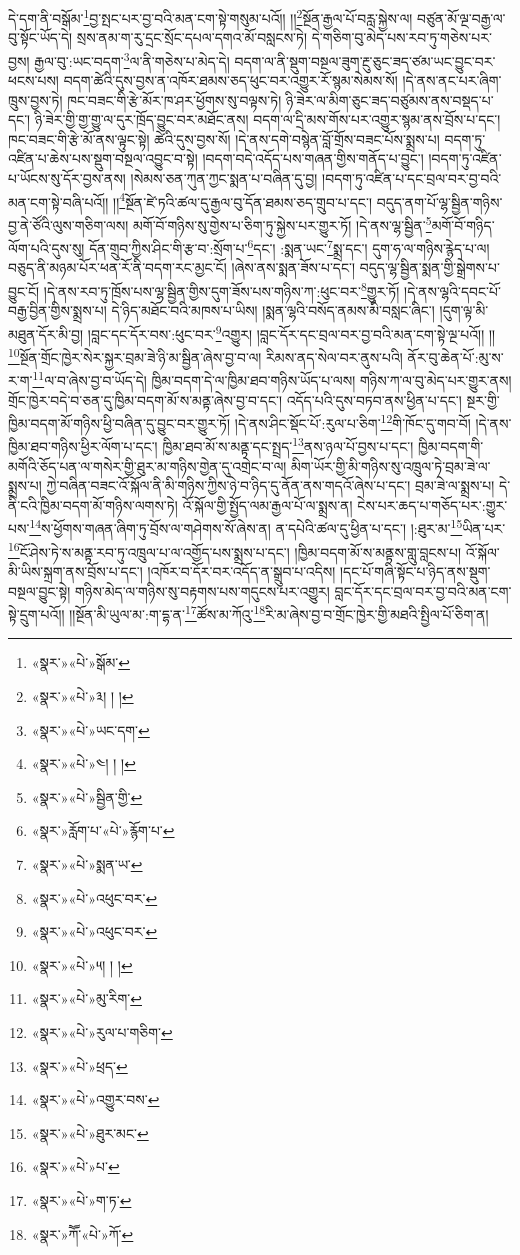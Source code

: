 དེ་དག་ནི་བསྒོམ་\footnote{«སྣར་»«པེ་»སྒོམ་}བྱ་སྤང་པར་བྱ་བའི་མན་ངག་སྟེ་གསུམ་པའོ།། །།\footnote{«སྣར་»«པེ་»༣། ། །}སྔོན་རྒྱལ་པོ་བརླ་སྐྱེས་ལ། བཙུན་མོ་ལྔ་བརྒྱ་ལ་བུ་སྟོང་ཡོད་དེ། སྲས་ནམ་ག་རུ་དྲང་སྲོང་དཔལ་དགའ་མོ་བསླངས་ཏེ། དེ་གཅིག་བུ་མེད་པས་རབ་ཏུ་གཅེས་པར་བྱས། རྒྱལ་བུ་:ཡང་བདག་\footnote{«སྣར་»«པེ་»ཡང་དག་}ལ་ནི་གཅེས་པ་མེད་དེ། བདག་ལ་ནི་སྡུག་བསྔལ་ཟུག་རྔུ་ཅུང་ཟད་ཙམ་ཡང་བྱུང་བར་ཕངས་པས། བདག་ཚེའི་དུས་བྱས་ན་འཁོར་ཐམས་ཅད་ཕུང་བར་འགྱུར་རོ་སྙམ་སེམས་སོ། །དེ་ནས་ནང་པར་ཞིག་ཁྲུས་བྱས་ཏེ། ཁང་བཟང་གི་རྩེ་མོར་ཁ་ཤར་ཕྱོགས་སུ་བལྟས་ཏེ། ཉི་ཟེར་ལ་མིག་ཅུང་ཟད་བཙུམས་ནས་བསྡད་པ་དང་། ཉི་ཟེར་གྱི་གྱ་གྱུ་ལ་དུར་ཁྲོད་བྱུང་བར་མཐོང་ནས། བདག་ལ་དྲི་མས་གོས་པར་འགྱུར་སྙམ་ནས་བྲོས་པ་དང་། ཁང་བཟང་གི་རྩེ་མོ་ནས་ལྟུང་སྟེ། ཚེའི་དུས་བྱས་སོ། །དེ་ནས་དགེ་བསྙེན་བློ་གྲོས་བཟང་པོས་སྨྲས་པ། བདག་ཏུ་འཛིན་པ་ཆེས་པས་སྡུག་བསྔལ་འབྱུང་བ་སྟེ། །བདག་བདེ་འདོད་པས་གཞན་གྱིས་གནོད་པ་བྱུང་། །བདག་ཏུ་འཛིན་པ་ཡོངས་སུ་དོར་བྱས་ནས། །སེམས་ཅན་ཀུན་ཀྱང་སྨན་པ་བཞིན་དུ་བྱ། །བདག་ཏུ་འཛིན་པ་དང་བྲལ་བར་བྱ་བའི་མན་ངག་སྟེ་བཞི་པའོ།། །།\footnote{«སྣར་»«པེ་»༤། ། །}སྔོན་ཛེ་ཏའི་ཚལ་དུ་རྒྱལ་བུ་དོན་ཐམས་ཅད་གྲུབ་པ་དང་། བདུད་ནག་པོ་ལྷ་སྦྱིན་གཉིས་བྱ་ནེ་ཙོའི་ལུས་གཅིག་ལས། མགོ་བོ་གཉིས་སུ་གྱེས་པ་ཅིག་ཏུ་སྐྱེས་པར་གྱུར་ཏོ། །དེ་ནས་ལྷ་སྦྱིན་\footnote{«སྣར་»«པེ་»སྦྱིན་གྱི་}མགོ་བོ་གཉིད་ལོག་པའི་དུས་སུ། དོན་གྲུབ་ཀྱིས་ཤིང་གི་རྩ་བ་:སྲོག་པ་\footnote{«སྣར་»རློག་པ་«པེ་»རྙོག་པ་}དང་། :སྨན་ཡང་\footnote{«སྣར་»«པེ་»སྨན་ཡ་}སྨྲ་དང་། དུག་ཧ་ལ་གཉིས་རྙེད་པ་ལ། བཅུད་ནི་མཉམ་པོར་ཕན་རོ་ནི་བདག་རང་མྱང་ངོ། །ཞེས་ནས་སྨན་ཟོས་པ་དང་། བདུད་ལྷ་སྦྱིན་སྨན་གྱི་སྒྲེགས་པ་བྱུང་ངོ། །དེ་ནས་རབ་ཏུ་ཁྲོས་པས་ལྷ་སྦྱིན་གྱིས་དུག་ཟོས་པས་གཉིས་ཀ་:ཕུང་བར་\footnote{«སྣར་»«པེ་»འཕུང་བར་}གྱུར་ཏོ། །དེ་ནས་ལྷའི་དབང་པོ་བརྒྱ་བྱིན་གྱིས་སྨྲས་པ། དེ་ཉིད་མཐོང་བའི་མཁས་པ་ཡིས། །སྨན་ལྷའི་བསོད་ནམས་མི་བསླང་ཞིང་། །དུག་ལྟ་མི་མཐུན་དོར་མི་བྱ། །བླང་དང་དོར་བས་:ཕུང་བར་\footnote{«སྣར་»«པེ་»འཕུང་བར་}འགྱུར། །བླང་དོར་དང་བྲལ་བར་བྱ་བའི་མན་ངག་སྟེ་ལྔ་པའོ།། །།\footnote{«སྣར་»«པེ་»༥། ། །}སྔོན་གྲོང་ཁྱེར་སེར་སྐྱར་བྲམ་ཟེ་ཉི་མ་སྦྱིན་ཞེས་བྱ་བ་ལ། རིམས་ནད་སེལ་བར་ནུས་པའི། ནོར་བུ་ཆེན་པོ་:མུ་ས་ར་ག་\footnote{«སྣར་»«པེ་»མུ་རིག་}ལ་བ་ཞེས་བྱ་བ་ཡོད་དེ། ཁྱིམ་བདག་དེ་ལ་ཁྱིམ་ཐབ་གཉིས་ཡོད་པ་ལས། གཉིས་ཀ་ལ་བུ་མེད་པར་གྱུར་ནས། གྲོང་ཁྱེར་བདེ་བ་ཅན་དུ་ཁྱིམ་བདག་མོ་ས་མནྟ་ཞེས་བྱ་བ་དང་། འདོད་པའི་དུས་བཏབ་ནས་ཕྱིན་པ་དང་། སྔར་གྱི་ཁྱིམ་བདག་མོ་གཉིས་ཕྱི་བཞིན་དུ་བྱུང་བར་གྱུར་ཏོ། །དེ་ནས་ཤིང་སྡོང་པོ་:རུལ་པ་ཅིག་\footnote{«སྣར་»«པེ་»རུལ་པ་གཅིག་}གི་ཁོང་དུ་གབ་བོ། །དེ་ནས་ཁྱིམ་ཐབ་གཉིས་ཕྱིར་ལོག་པ་དང་། ཁྱིམ་ཐབ་མོ་ས་མནྟ་དང་སྤྲད་\footnote{«སྣར་»«པེ་»ཕྲད་}ནས་ཉལ་པོ་བྱས་པ་དང་། ཁྱིམ་བདག་གི་མགོའི་ཅོད་པན་ལ་གསེར་གྱི་ཐུར་མ་གཉིས་གྱེན་དུ་འགྲེང་བ་ལ། མིག་ཡོར་གྱི་མི་གཉིས་སུ་འཁྲུལ་ཏེ་བྲམ་ཟེ་ལ་སྨྲས་པ། ཀྱེ་བཞིན་བཟང་འོ་སྐོལ་ནི་མི་གཉིས་ཀྱིས་ཉེ་བ་ཉིད་དུ་ནོན་ནས་གདའོ་ཞེས་པ་དང་། བྲམ་ཟེ་ལ་སྨྲས་པ། དེ་ནི་ངའི་ཁྱིམ་བདག་མོ་གཉིས་ལགས་ཏེ། འོ་སྐོལ་གྱི་སྤྱོད་ལམ་རྒྱལ་པོ་ལ་སྨྲས་ན། ངེས་པར་ཆད་པ་གཅོད་པར་:གྱུར་པས་\footnote{«སྣར་»«པེ་»འགྱུར་བས་}ས་ཕྱོགས་གཞན་ཞིག་ཏུ་བྲོས་ལ་གཤེགས་སོ་ཞེས་ན། ན་དཔེའི་ཚལ་དུ་ཕྱིན་པ་དང་། །:ཐུར་མ་\footnote{«སྣར་»«པེ་»ཐུར་མང་}ཡིན་པར་\footnote{«སྣར་»«པེ་»པ་}ངོ་ཤེས་ཏེ་ས་མནྟ་རབ་ཏུ་འཁྲུལ་པ་ལ་འགྱོད་པས་སྨྲས་པ་དང་། །ཁྱིམ་བདག་མོ་ས་མནྟས་གླུ་བླངས་པ། འོ་སྐོལ་མི་ཡིས་སྐྲག་ནས་བྲོས་པ་དང་། །འཁོར་བ་དོར་བར་འདོད་ན་སྒྲུབ་པ་འདིས། །དང་པོ་གཞི་སྟོང་པ་ཉིད་ནས་སྡུག་བསྔལ་བྱུང་སྟེ། གཉིས་མེད་ལ་གཉིས་སུ་བརྟགས་པས་གདུངས་པར་འགྱུར། བླང་དོར་དང་བྲལ་བར་བྱ་བའི་མན་ངག་སྟེ་དྲུག་པའོ།། །།སྔོན་མི་ཡུལ་མ་:ག་དྷ་ན་\footnote{«སྣར་»«པེ་»ག་ཏ་}ཚོས་མ་ཀོའུ་\footnote{«སྣར་»ཀཽ་«པེ་»ཀོ་}རི་མ་ཞེས་བྱ་བ་གྲོང་ཁྱེར་གྱི་མཐའི་སྤྱིལ་པོ་ཅིག་ན། 